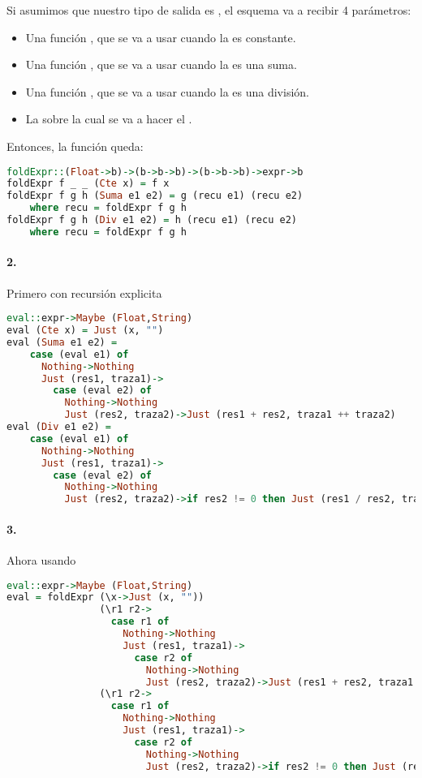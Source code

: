 Si asumimos que nuestro tipo de salida es , el esquema  va a recibir 4 parámetros:
\begin{itemize}
  \item Una función , que se va a usar cuando la  es constante.
  \item Una función , que se va a usar cuando la  es una suma.
  \item Una función , que se va a usar cuando la  es una división.
  \item La  sobre la cual se va a hacer el .
\end{itemize}

Entonces, la función queda:
\begin{lstlisting}[language=Haskell]
foldExpr::(Float->b)->(b->b->b)->(b->b->b)->expr->b
foldExpr f _ _ (Cte x) = f x
foldExpr f g h (Suma e1 e2) = g (recu e1) (recu e2)
    where recu = foldExpr f g h
foldExpr f g h (Div e1 e2) = h (recu e1) (recu e2)
    where recu = foldExpr f g h
\end{lstlisting}

\paragraph{2.} Primero con recursión explicita
\begin{lstlisting}[language=Haskell]
eval::expr->Maybe (Float,String)
eval (Cte x) = Just (x, "")
eval (Suma e1 e2) =
    case (eval e1) of
      Nothing->Nothing
      Just (res1, traza1)->
        case (eval e2) of
          Nothing->Nothing
          Just (res2, traza2)->Just (res1 + res2, traza1 ++ traza2)
eval (Div e1 e2) =
    case (eval e1) of
      Nothing->Nothing
      Just (res1, traza1)->
        case (eval e2) of
          Nothing->Nothing
          Just (res2, traza2)->if res2 != 0 then Just (res1 / res2, traza1 ++ traza2) else Nothing
\end{lstlisting}

\paragraph{3.} Ahora usando 
\begin{lstlisting}[language=Haskell]
eval::expr->Maybe (Float,String)
eval = foldExpr (\x->Just (x, ""))
                (\r1 r2->
                  case r1 of
                    Nothing->Nothing
                    Just (res1, traza1)->
                      case r2 of
                        Nothing->Nothing
                        Just (res2, traza2)->Just (res1 + res2, traza1 ++ traza2))
                (\r1 r2->
                  case r1 of
                    Nothing->Nothing
                    Just (res1, traza1)->
                      case r2 of
                        Nothing->Nothing
                        Just (res2, traza2)->if res2 != 0 then Just (res1 / res2, traza1 ++ traza2) else Nothing)
\end{lstlisting}

